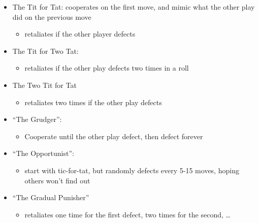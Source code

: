 \begin{frame}{}
\protect\hypertarget{section-40}{}

\begin{itemize}
\tightlist
\item
  The Tit for Tat: cooperates on the first move, and mimic what the
  other play did on the previous move

  \begin{itemize}
  \tightlist
  \item
    retaliates if the other player defects
  \end{itemize}
\item
  The Tit for Two Tat:

  \begin{itemize}
  \tightlist
  \item
    retaliates if the other play defects two times in a roll
  \end{itemize}
\item
  The Two Tit for Tat

  \begin{itemize}
  \tightlist
  \item
    retaliates two times if the other play defects
  \end{itemize}
\end{itemize}

\end{frame}

\begin{frame}{}
\protect\hypertarget{section-41}{}

\begin{itemize}
\tightlist
\item
  ``The Grudger'':

  \begin{itemize}
  \tightlist
  \item
    Cooperate until the other play defect, then defect forever
  \end{itemize}
\item
  ``The Opportunist'':

  \begin{itemize}
  \tightlist
  \item
    start with tic-for-tat, but randomly defects every 5-15 moves,
    hoping others won't find out
  \end{itemize}
\item
  ``The Gradual Punisher''

  \begin{itemize}
  \tightlist
  \item
    retaliates one time for the first defect, two times for the second,
    \ldots{}
  \end{itemize}
\end{itemize}

\end{frame}

